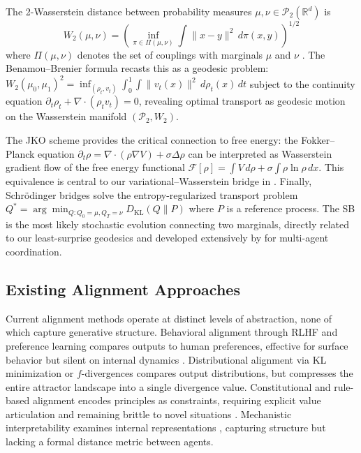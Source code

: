\documentclass[11pt,a4paper]{article}
\theoremstyle{definition}
\newcommand{\R}{\mathbb{R}}
\newcommand{\cP}{\mathcal{P}}
\newcommand{\cF}{\mathcal{F}}  %
\newcommand{\Wass}{W_2}
\newcommand{\dkl}{D_{\mathrm{KL}}}
\begin{document}
The 2-Wasserstein distance between probability measures $\mu, \nu \in \cP_2(\R^d)$ is
\begin{equation}
  \Wass(\mu, \nu) = \left(\inf_{\pi \in \Pi(\mu, \nu)} \int \|x - y\|^2 \, d\pi(x, y)\right)^{1/2}
  \label{eq:wasserstein}
\end{equation}
where $\Pi(\mu, \nu)$ denotes the set of couplings with marginals $\mu$ and $\nu$ \citep{villani2008optimal}. The Benamou--Brenier formula \citep{benamou2000computational} recasts this as a geodesic problem: $\Wass(\mu_0, \mu_1)^2 = \inf_{(\rho_t, v_t)} \int_0^1 \int \|v_t(x)\|^2 \, d\rho_t(x) \, dt$ subject to the continuity equation $\partial_t \rho_t + \nabla \cdot (\rho_t v_t) = 0$, revealing optimal transport as geodesic motion on the Wasserstein manifold $(\cP_2, \Wass)$.

The JKO scheme \citep{jordan1998variational} provides the critical connection to free energy: the Fokker--Planck equation $\partial_t \rho = \nabla \cdot (\rho \nabla V) + \sigma \Delta \rho$ can be interpreted as Wasserstein gradient flow of the free energy functional $\cF[\rho] = \int V \, d\rho + \sigma \int \rho \ln \rho \, dx$. This equivalence is central to our variational--Wasserstein bridge in . Finally, Schr\"{o}dinger bridges \citep{leonard2013survey, chen2021stochastic} solve the entropy-regularized transport problem $Q^* = \arg\min_{Q: Q_0 = \mu, Q_T = \nu} \dkl(Q \| P)$ where $P$ is a reference process. The SB is the most likely stochastic evolution connecting two marginals, directly related to our least-surprise geodesics and developed extensively by \citet{goertzel2025judging} for multi-agent coordination.

\subsection{Existing Alignment Approaches}
\label{sec:bg_alignment}

Current alignment methods operate at distinct levels of abstraction, none of which capture generative structure. Behavioral alignment through RLHF and preference learning compares outputs to human preferences, effective for surface behavior but silent on internal dynamics \citep{christiano2017deep, ouyang2022training}. Distributional alignment via KL minimization or $f$-divergences compares output distributions, but compresses the entire attractor landscape into a single divergence value. Constitutional and rule-based alignment encodes principles as constraints, requiring explicit value articulation and remaining brittle to novel situations \citep{bai2022constitutional}. Mechanistic interpretability examines internal representations \citep{elhage2022superposition, conmy2023towards}, capturing structure but lacking a formal distance metric between agents.
\end{document}
